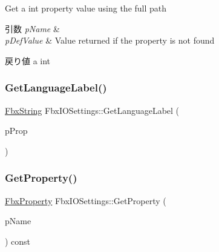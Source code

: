 Get a int property value using the full path 
\begin{DoxyParams}{引数}
{\em p\+Name} & \\
\hline
{\em p\+Def\+Value} & Value returned if the property is not found \\
\hline
\end{DoxyParams}
\begin{DoxyReturn}{戻り値}
a int 
\end{DoxyReturn}
\mbox{\label{class_fbx_i_o_settings_a2588777e1bbeed1602e2538fa47cd986}} 
\subsubsection{\texorpdfstring{Get\+Language\+Label()}{GetLanguageLabel()}}
{\footnotesize\ttfamily \hyperlink{class_fbx_string}{Fbx\+String} Fbx\+I\+O\+Settings\+::\+Get\+Language\+Label (\begin{DoxyParamCaption}\item[{\hyperlink{class_fbx_property}{Fbx\+Property} \&}]{p\+Prop }\end{DoxyParamCaption})}

\mbox{\label{class_fbx_i_o_settings_aa02805702152a4ef56d337c25b12d42b}} 
\subsubsection{\texorpdfstring{Get\+Property()}{GetProperty()}\hspace{0.1cm}{\footnotesize\ttfamily [1/2]}}
{\footnotesize\ttfamily \hyperlink{class_fbx_property}{Fbx\+Property} Fbx\+I\+O\+Settings\+::\+Get\+Property (\begin{DoxyParamCaption}\item[{const char $\ast$}]{p\+Name }\end{DoxyParamCaption}) const}

